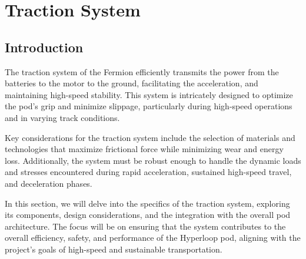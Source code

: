 \chapter{Traction System}

\section{Introduction}
The traction system of the Fermion efficiently transmits the power from the batteries to the motor to the ground, facilitating the acceleration, and maintaining high-speed stability. This system is intricately designed to optimize the pod's grip and minimize slippage, particularly during high-speed operations and in varying track conditions. 

Key considerations for the traction system include the selection of materials and technologies that maximize frictional force while minimizing wear and energy loss. Additionally, the system must be robust enough to handle the dynamic loads and stresses encountered during rapid acceleration, sustained high-speed travel, and deceleration phases. 

In this section, we will delve into the specifics of the traction system, exploring its components, design considerations, and the integration with the overall pod architecture. The focus will be on ensuring that the system contributes to the overall efficiency, safety, and performance of the Hyperloop pod, aligning with the project's goals of high-speed and sustainable transportation.






\newpage
